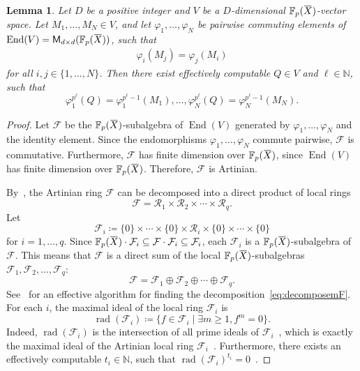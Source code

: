 \documentclass[letterpaper, 11pt, thm-restate]{article}
\numberwithin{equation}{section}
\newcommand{\N}{\mathbb{N}}
\newcommand{\F}{\mathbb{F}}
\newcommand{\End}{\operatorname{End}}
\newcommand{\rad}{\operatorname{rad}}
\newcommand{\mF}{\mathcal{F}}
\newcommand{\M}{\mathsf{M}}
\newcommand{\mR}{\mathcal{R}}
\newcommand{\oX}{\mkern 1.5mu\overline{\mkern-1.5mu X \mkern-1.5mu}\mkern 1.5mu}
\newtheorem{lem}[thrm]{Lemma}
\theoremstyle{definition}
\theoremstyle{definition}
\theoremstyle{definition}
\begin{document}
\begin{lem}\label{lem:invertphi}
    Let $D$ be a positive integer and $V$ be a $D$-dimensional $\F_p(\oX)$-vector space.
    Let $M_1, \ldots, M_N \in V$, and let $\varphi_1, \ldots, \varphi_N$ be pairwise commuting elements of $\End(V) = \M_{d \times d}(\F_p(\oX))$, such that
    \begin{align*}
        \varphi_i(M_j) = \varphi_j(M_i)
    \end{align*}
    for all $i, j \in \{1, \ldots, N\}$.
    Then there exist effectively computable $Q \in V$ and $\ell \in \N$, such that
    \[
    \varphi_1^{p^{\ell}}(Q) = \varphi_1^{p^{\ell}-1}(M_1), \ldots, \varphi_N^{p^{\ell}}(Q) = \varphi_N^{p^{\ell}-1}(M_N).
    \]
\end{lem}
\begin{proof}
    Let $\mF$ be the $\F_p(\oX)$-subalgebra of $\End(V)$ generated by $\varphi_1, \ldots, \varphi_N$ and the identity element.
    Since the endomorphisms $\varphi_1, \ldots, \varphi_N$ commute pairwise, $\mF$ is commutative.
    Furthermore, $\mF$ has finite dimension over $\F_p(\oX)$, since $\End(V)$ has finite dimension over $\F_p(\oX)$.
    Therefore, $\mF$ is Artinian.
    
    By~\cite[Corollary~2.16]{eisenbud2013commutative}, the Artinian ring $\mF$ can be decomposed into a direct product of local rings
    \[
    \mF = \mR_1 \times \mR_2 \times \cdots \times \mR_q.
    \]
    Let 
    \[
    \mF_i \coloneqq \{0\} \times \cdots \times \{0\}  \times \mR_i \times \{0\} \times \cdots \times \{0\}
    \]
    for $i = 1, \ldots, q$.
    Since $\F_p(\oX) \cdot \mF_i \subseteq \mF \cdot \mF_i \subseteq \mF_i$, each $\mF_i$ is a $\F_p(\oX)$-subalgebra of $\mF$.
    This means that $\mF$ is a direct sum of the local $\F_p(\oX)$-subalgebras $\mF_1, \mF_2, \ldots, \mF_q$:
    \begin{equation}\label{eq:decomposemF}
    \mF = \mF_1 \oplus \mF_2 \oplus \cdots \oplus \mF_q.
    \end{equation}
    See~\cite[Section~3.2,~p.501]{babai1996multiplicative} for an effective algorithm for finding the decomposition~\eqref{eq:decomposemF}.
    For each $i$, the maximal ideal of the local ring $\mF_i$ is
    \[
    \rad(\mF_i) \coloneqq \{f \in \mF_i \mid \exists m \geq 1, f^m = 0\}.
    \]
    Indeed, $\rad(\mF_i)$ is the intersection of all prime ideals of $\mF_i$~\cite[Proposition~1.8]{atiyah1969introduction}, which is exactly the maximal ideal of the Artinian local ring $\mF_i$~\cite[Proposition~8.1]{atiyah1969introduction}.
    Furthermore, there exists an effectively computable $t_i \in \N$, such that $\rad(\mF_i)^{t_i} = 0$~\cite[Proposition~8.6]{atiyah1969introduction}.
    

\end{proof}
\end{document}
